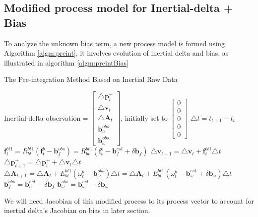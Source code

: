 \documentclass[12pt]{article}   %
\begin{document}
\subsection{Modified process model for Inertial-delta + Bias}
To analyze the unknown bias term, a new process model is formed using Algorithm \ref{algm:preint}, it involves evolution of inertial delta and bias, as illustrated in algorithm \ref{algm:preintBias}
\begin{algorithm}
	\caption{The Pre-integration Method Based on Inertial Raw Data}
	\label{algm:preintBias}		
	\begin{algorithmic}
		\STATE Inertial-delta observation = $\begin{bmatrix} 
		\triangle \textbf{p}_{t}^+ \\
		\triangle \textbf{v}_{t} \\
		\triangle \textbf{A} _{t} \\
		\textbf{b}_a^{obs} \\
		\textbf{b}_{\omega}^{obs}
		\end{bmatrix}$, initially set to $\begin{bmatrix} 
		0 \\ 
		0 \\ 
		0 \\
		0 \\
		0
		\end{bmatrix}$
		\STATE $\triangle t =  t_{t+1} - t_t$ 
		\STATE $\textbf{f}_t^{bt1} = R_{bt}^{bt1} (\textbf{f}_t^b - \textbf{b}_f^{obs}) = R_{bt}^{bt1} (\textbf{f}_t^b - \textbf{b}_f^{est} + \delta \bm{b}_f)$ 
		\STATE $\triangle \textbf{v}_{t+1} = \triangle \textbf{v}_{t} + \textbf{f}_t^{bt1} \triangle t$ 
		\STATE $\triangle \textbf{p}_{t+1}^+ = \triangle \textbf{p}_{t}^+ + \triangle \textbf{v}_t \triangle t$ 
		\STATE $\triangle \textbf{A} _{t+1} = \triangle \textbf{A} _{t} + E_{bt}^{bt1} (\omega _t^b - \textbf{b}_\omega^{obs} ) \triangle t= \triangle \textbf{A} _{t} + E_{bt}^{bt1} (\omega _t^b - \textbf{b}_\omega^{est} +  \delta \bm{b}_{\omega}) \triangle t$ 
		\STATE $\textbf{b}_f^{obs} = \textbf{b}_a^{est} - \delta \bm{b}_f$
		\STATE $\textbf{b}_{\omega}^{obs} = \textbf{b}_{\omega}^{est} -  \delta \bm{b}_{\omega}$
		\ENDFOR
	\end{algorithmic}
\end{algorithm}
We will need Jacobian of this modified process to its process vector to account for inertial delta's Jacobian on bias in later section.
\end{document}
